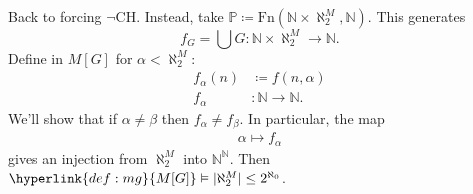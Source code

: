 \documentclass{article}
\newcommand{\p}{\mathbb{P}}
\newcommand{\1}{\mathbbm{1}}
\let\models\vDash
\begin{document}
\medskip
Back to forcing $\neg$\textsf{CH}.
Instead, take $\p \coloneqq \text{Fn}(\mathbb{N} \times \aleph_2^M, \mathbb{N})$.
This generates
\begin{equation*}f_G = \bigcup G: \mathbb{N} \times \aleph_2^M \to \mathbb{N}.\end{equation*}
Define in $M[G]$ for $\alpha < \aleph_2^M$:
\begin{align*}
  f_\alpha(n) &\coloneqq f(n,\alpha) \\
  f_\alpha&: \mathbb{N} \to \mathbb{N}.
\end{align*}
We'll show that if $\alpha \neq \beta$ then $f_\alpha \neq f_\beta$.
In particular, the map
\begin{align*}
  \alpha \mapsto f_\alpha
\end{align*}
gives an injection from $\aleph_2^M$ into $\mathbb{N}^\mathbb{N}$.
Then $\hyperlink{def:mg}{M[G]} \models |\aleph_2^M| \leq 2^{\aleph_0}$.
\end{document}
